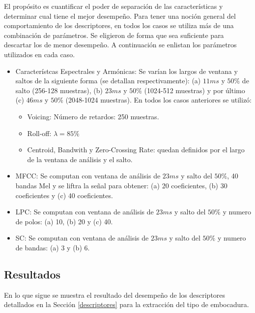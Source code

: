 \documentclass{article}
\begin{document}
El propósito es cuantificar el poder de separación de las características y determinar cual tiene el mejor desempeño. Para tener una noción general del comportamiento de los descriptores, en todos los casos se utiliza más de una combinación de parámetros. Se eligieron de forma que sea suficiente para descartar los de menor desempeño. A continuación se enlistan los parámetros utilizados en cada caso.

\begin{itemize}
	\item Característcas Espectrales y Armónicas: Se varían los largos de ventana y saltos de la siguiente forma (se detallan respectivamente): (a) $11ms$ y $50\%$ de salto (256-128 muestras), (b) $23ms$ y $50\%$  (1024-512 muestras) y por último (c) $46ms$ y $50\%$  (2048-1024 muestras). En todos los casos anteriores se utilizó: 
	\begin{itemize}
		\item Voicing: Número de retardos: 250 muestras.
		\item Roll-off: $\lambda=85\%$
		\item Centroid, Bandwith y Zero-Crossing Rate: quedan definidos por el largo de la ventana de análisis y el salto.
	\end{itemize}
	\item MFCC: Se computan con ventana de análisis de $23ms$ y salto del $50\%$, 40 bandas Mel y se liftra la señal para obtener: (a) 20 coeficientes, (b) 30 coeficientes y (c) 40 coeficientes.
	\item LPC: Se computan con ventana de análisis de $23ms$ y salto del $50\%$ y numero de polos: (a) 10, (b) 20 y (c) 40.
	\item SC: Se computan con ventana de análisis de $23ms$ y salto del $50\%$ y numero de bandas: (a) 3 y (b) 6.
\end{itemize}

\subsection{Resultados}

En lo que sigue se muestra el resultado del desempeño de los descriptores detallados en la Sección \ref{descriptores} para la extracción del tipo de embocadura.
\medskip
\end{document}
